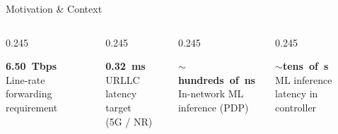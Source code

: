 {
\begin{frame}{Motivation \& Context}


  \begin{columns}[T, totalwidth=\textwidth]

    \begin{column}{0.245\textwidth}
      \begin{tcolorbox}[statbox]
        \centering
        {\color{white}\bfseries\Large 6.50~Tbps}\\[3pt]
        {\fontsize{7}{8}\selectfont\color{white}
          Line-rate forwarding requirement}
      \end{tcolorbox}
    \end{column}

    \begin{column}{0.245\textwidth}
      \begin{tcolorbox}[statbox]
        \centering
        {\color{white}\bfseries\Large 0.32~ms}\\[3pt]
        {\fontsize{7}{8}\selectfont\color{white}
          URLLC latency target \\(5G / NR)}
      \end{tcolorbox}
    \end{column}

    \begin{column}{0.245\textwidth}
      \begin{tcolorbox}[statbox]
        \centering
        {\color{white}\bfseries\Large $\sim$hundreds~of~ns}\\[3pt]
        {\fontsize{7}{8}\selectfont\color{white}
          In-network ML inference (PDP)}
      \end{tcolorbox}
    \end{column}
    
    \begin{column}{0.245\textwidth}
      \begin{tcolorbox}[statbox]
        \centering
        {\color{white}\bfseries\Large $\sim$tens~of~\textmu s}\\[3pt]
        {\fontsize{7}{8}\selectfont\color{white}
          ML inference latency in controller}
      \end{tcolorbox}
    \end{column}
    

\end{columns}
\end{frame}}
